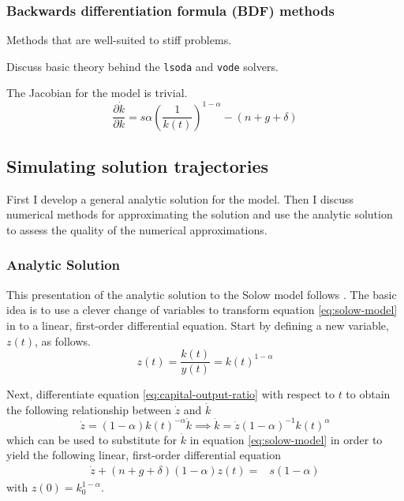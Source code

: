 \documentclass[11pt]{article}
\begin{document}
\subsubsection{Backwards differentiation formula (BDF) methods}
Methods that are well-suited to stiff problems.

Discuss basic theory behind the \texttt{lsoda} and \texttt{vode} solvers.
 
The Jacobian for the \cite{solow1956contribution} model is trivial.
\begin{equation}
	\frac{\partial \dot{k}}{\partial k} = s\alpha \left(\frac{1}{k(t)}\right)^{1-\alpha} - (n+g+\delta)
\end{equation}


\subsection{Simulating solution trajectories}
First I develop a general analytic solution for the model. Then I discuss numerical methods for approximating the solution and use the analytic solution to assess the quality of the numerical approximations.

\subsubsection{Analytic Solution}
This presentation of the analytic solution to the Solow model follows \cite{sato1963fiscal}.  The basic idea is to use a clever change of variables to transform equation \ref{eq:solow-model} in to a linear, first-order differential equation.  Start by defining a new variable, $z(t)$, as follows. 
\begin{equation}\label{eq:capital-output-ratio}
	z(t) = \frac{k(t)}{y(t)} = k(t)^{1-\alpha} 
\end{equation}

Next, differentiate equation \ref{eq:capital-output-ratio} with respect to $t$ to obtain the following relationship between $\dot{z}$ and $\dot{k}$
\begin{equation}
	\dot{z} = (1-\alpha)k(t)^{-\alpha}\dot{k} \implies \dot{k} = \dot{z}(1-\alpha)^{-1}k(t)^{\alpha}
\end{equation}
which can be used to substitute for $\dot{k}$ in equation \ref{eq:solow-model} in order to yield the following linear, first-order differential equation
\begin{align}\label{eq:solow-model-2}
	\dot{z} + (n + g + \delta) (1-\alpha) z(t) =& s(1-\alpha) 
\end{align}
with $z(0) = k_0^{1-\alpha}$.
\end{document}
